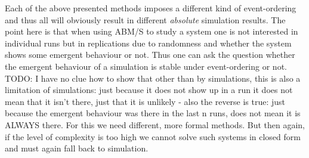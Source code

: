 Each of the above presented methods imposes a different kind of event-ordering and thus all will obviously result in different \textit{absolute} simulation results. The point here is that when using ABM/S to study a system one is not interested in individual runs but in replications due to randomness and whether the system shows some emergent behaviour or not. Thus one can ask the question whether the emergent behaviour of a simulation is stable under event-ordering or not. TODO: I have no clue how to show that other than by simulations, this is also a limitation of simulations: just because it does not show up in a run it does not mean that it isn't there, just that it is unlikely - also the reverse is true: just because the emergent behaviour was there in the last n runs, does not mean it is ALWAYS there. For this we need different, more formal methods. But then again, if the level of complexity is too high we cannot solve such systems in closed form and must again fall back to simulation.